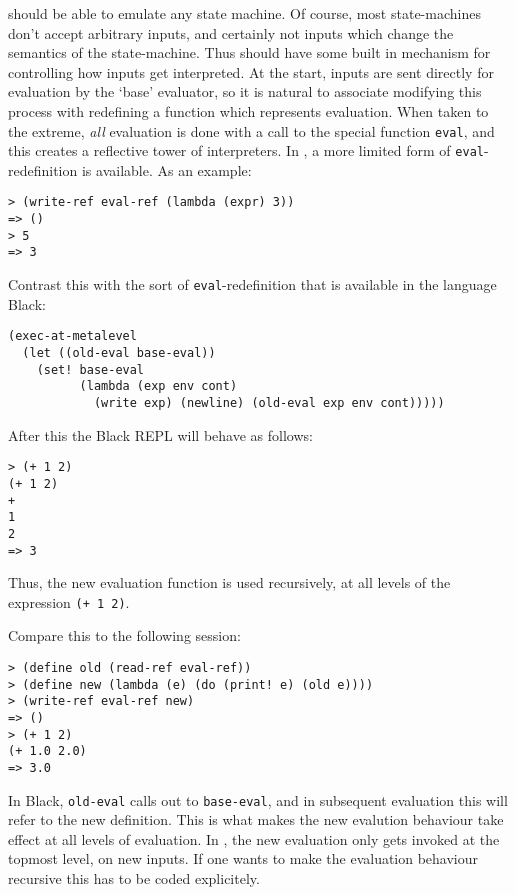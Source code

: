 \rad{} should be able to emulate any state machine. Of course, most state-machines
don't accept arbitrary inputs, and certainly not inputs which change the
semantics of the state-machine. Thus \rad{} should have some built in mechanism
for controlling how inputs get interpreted. At the start, inputs are sent
directly for evaluation by the `base' evaluator, so it is natural to associate
modifying this process with redefining a function which represents evaluation.
When taken to the extreme, \emph{all} evaluation is done with a call to the
special function \texttt{eval}, and this creates a reflective tower of
interpreters. In \rad{}, a more limited form of \texttt{eval}-redefinition is
available. As an example:
\bigskip
\begin{Verbatim}
> (write-ref eval-ref (lambda (expr) 3))
=> ()
> 5
=> 3
\end{Verbatim}
Contrast this with the sort of \texttt{eval}-redefinition that is available in
the language Black\cite{Asai1997}:
\begin{lstlisting}
(exec-at-metalevel
  (let ((old-eval base-eval))
    (set! base-eval
          (lambda (exp env cont)
            (write exp) (newline) (old-eval exp env cont)))))
\end{lstlisting}
After this the Black REPL will behave as follows:
\bigskip
\begin{Verbatim}
> (+ 1 2)
(+ 1 2)
+
1
2
=> 3
\end{Verbatim}
Thus, the new evaluation function is used recursively, at all levels of the
expression \texttt{(+ 1 2)}.

Compare this to the following \rad{} session:
\bigskip
\begin{Verbatim}
> (define old (read-ref eval-ref))
> (define new (lambda (e) (do (print! e) (old e))))
> (write-ref eval-ref new)
=> ()
> (+ 1 2)
(+ 1.0 2.0)
=> 3.0
\end{Verbatim}
In Black, \texttt{old-eval} calls out to
\texttt{base-eval}, and in subsequent evaluation this will refer to the new
definition. This is what makes the new evalution behaviour take effect at all
levels of evaluation. In \rad{}, the new evaluation only gets invoked at the
topmost level, on new inputs. If one wants to make the evaluation behaviour
recursive this has to be coded explicitely.

